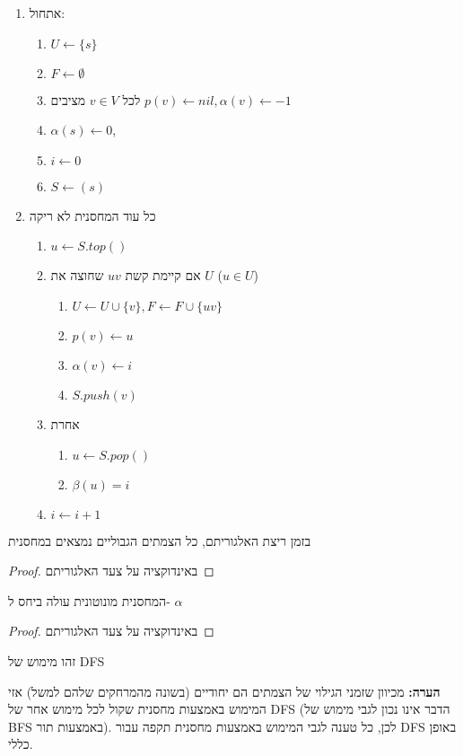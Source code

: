 \begin{enumerate}
\item
אתחול:
\begin{enumerate}
\item
$U \leftarrow \{s\}$
\item
$F \leftarrow \emptyset$
\item
לכל 
$v \in V$
מציבים
$p(v) \leftarrow nil, \alpha(v) \leftarrow -1$
\item
$\alpha(s) \leftarrow 0$,
\item
$i \leftarrow 0$
\item
$S \leftarrow (s)$
\end{enumerate}

\item
כל עוד המחסנית לא ריקה
\begin{enumerate}
	\item
	$u \leftarrow S.top()$
	\item 
	אם קיימת קשת 
	$uv$
	שחוצה את $U$ 
	($u \in U$)
		\begin{enumerate}
		\item
		$U \leftarrow U \cup \{v\}, F \leftarrow F \cup \{uv\}$
		\item
		$p(v) \leftarrow u$
		\item
		$\alpha(v) \leftarrow i$
		\item
		$S.push(v)$
		\end{enumerate}
	\item
	אחרת 
	\begin{enumerate}
		\item $u \leftarrow S.pop()$
		\item $\beta(u) = i$
	\end{enumerate}
	\item
	$i \leftarrow i + 1$
	\end{enumerate}
\end{enumerate}

\begin{claim}
בזמן ריצת האלגוריתם, כל הצמתים הגבוליים נמצאים במחסנית
\end{claim}
\begin{proof}
באינדוקציה על צעד האלגוריתם
\end{proof}
\begin{claim}
המחסנית מונוטונית עולה ביחס ל-%
$\alpha$
\end{claim}
\begin{proof}
באינדוקציה על צעד האלגוריתם
\end{proof}

\begin{corollary}
זהו מימוש של DFS
\end{corollary}

\textbf{הערה:}
מכיוון שזמני הגילוי של הצמתים הם יחודיים (בשונה מהמרחקים שלהם למשל) אזי המימוש באמצעות מחסנית
שקול לכל מימוש אחר של DFS (הדבר אינו נכון לגבי מימוש של BFS באמצעות תור).
לכן, כל טענה לגבי המימוש באמצעות מחסנית תקפה עבור DFS באופן כללי.
